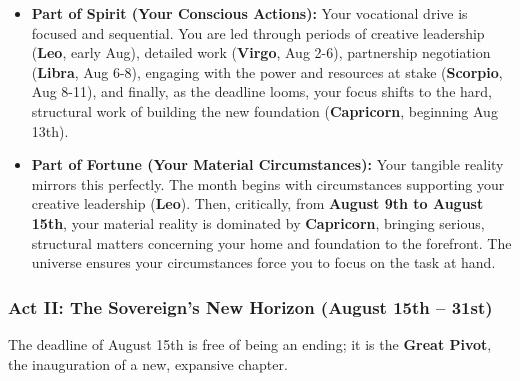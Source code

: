\documentclass{article}
\begin{document}
\begin{itemize}
  \begin{itemize}
  \tightlist
  \item
    \textbf{Part of Spirit (Your Conscious Actions):} Your vocational drive is focused and sequential. You are led through periods of creative leadership (\textbf{Leo}, early Aug), detailed work (\textbf{Virgo}, Aug 2-6), partnership negotiation (\textbf{Libra}, Aug 6-8), engaging with the power and resources at stake (\textbf{Scorpio}, Aug 8-11), and finally, as the deadline looms, your focus shifts to the hard, structural work of building the new foundation (\textbf{Capricorn}, beginning Aug 13th).
  \item
    \textbf{Part of Fortune (Your Material Circumstances):} Your tangible reality mirrors this perfectly. The month begins with circumstances supporting your creative leadership (\textbf{Leo}). Then, critically, from \textbf{August 9th to August 15th}, your material reality is dominated by \textbf{Capricorn}, bringing serious, structural matters concerning your home and foundation to the forefront. The universe ensures your circumstances force you to focus on the task at hand.
  \end{itemize}
\end{itemize}

\subsubsection*{Act II: The Sovereign's New Horizon (August 15th -- 31st)}\label{act-ii-the-sovereigns-new-horizon-august-15th-31st}

The deadline of August 15th is free of being an ending; it is the \textbf{Great Pivot}, the inauguration of a new, expansive chapter.
\end{document}
